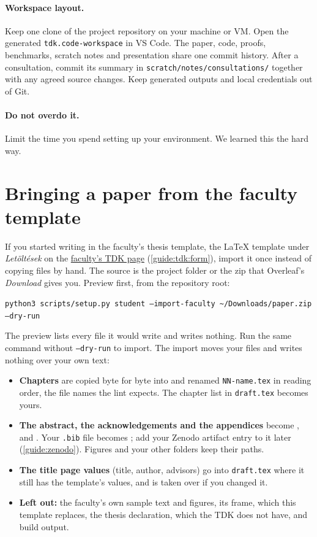 \paragraph{Workspace layout.} Keep one clone of the project repository on your machine or VM. Open the generated \texttt{tdk.code-workspace} in VS Code. The paper, code, proofs, benchmarks, scratch notes and presentation share one commit history. After a consultation, commit its summary in \texttt{scratch/notes/consultations/} together with any agreed source changes. Keep generated outputs and local credentials out of Git.

\paragraph{Do not overdo it.} Limit the time you spend setting up your environment. We learned this the hard way.

\section{Bringing a paper from the faculty template}\label{guide:start:faculty}
If you started writing in the faculty's thesis template, the \LaTeX{} template under \emph{Letöltések} on the \href{https://tdk.bme.hu/conference/VIK/2026/Download}{faculty's TDK page} (\cref{guide:tdk:form}), import it once instead of copying files by hand. The source is the project folder or the zip that Overleaf's \emph{Download} gives you. Preview first, from the repository root:

\texttt{python3 scripts/setup.py student --import-faculty \textasciitilde/Downloads/paper.zip --dry-run}

The preview lists every file it would write and writes nothing. Run the same command without \texttt{--dry-run} to import. The import moves your files and writes nothing over your own text:
\begin{itemize}
  \item \textbf{Chapters} are copied byte for byte into  and renamed \texttt{NN-name.tex} in reading order, the file names the lint expects. The chapter list in \texttt{draft.tex} becomes yours.
  \item \textbf{The abstract, the acknowledgements and the appendices} become ,  and . Your \texttt{.bib} file becomes ; add your Zenodo artifact entry to it later (\cref{guide:zenodo}). Figures and your other folders keep their paths.
  \item \textbf{The title page values} (title, author, advisors) go into \texttt{draft.tex} where it still has the template's values, and  is taken over if you changed it.
  \item \textbf{Left out:} the faculty's own sample text and figures, its  frame, which this template replaces, the thesis declaration, which the TDK does not have, and build output.
\end{itemize}


